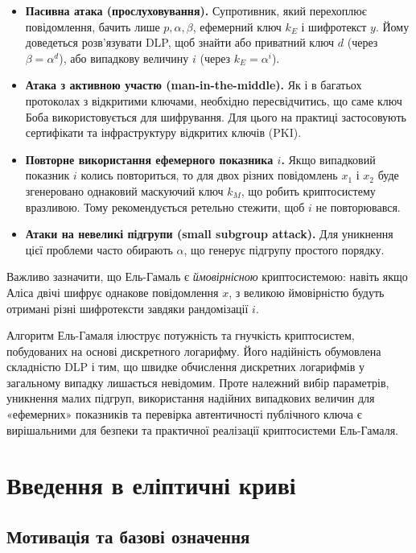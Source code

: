 \documentclass[12pt]{report}
\theoremstyle{definition}
\theoremstyle{plain}
\begin{document}
\begin{itemize}
    \item \textbf{Пасивна атака (прослуховування).} Супротивник, який перехоплює повідомлення, бачить лише \(p, \alpha, \beta\), ефемерний ключ \(k_E\) і шифротекст \(y\). Йому доведеться розв’язувати DLP, щоб знайти або приватний ключ \(d\) (через \(\beta = \alpha^d\)), або випадкову величину \(i\) (через \(k_E = \alpha^i\)).
    \item \textbf{Атака з активною участю (man-in-the-middle).} Як і в багатьох протоколах з відкритими ключами, необхідно пересвідчитись, що саме ключ Боба використовується для шифрування. Для цього на практиці застосовують сертифікати та інфраструктуру відкритих ключів (PKI).
    \item \textbf{Повторне використання ефемерного показника \(i\).} Якщо випадковий показник \(i\) колись повториться, то для двох різних повідомлень \(x_1\) і \(x_2\) буде згенеровано однаковий маскуючий ключ \(k_M\), що робить криптосистему вразливою. Тому рекомендується ретельно стежити, щоб \(i\) не повторювався.
    \item \textbf{Атаки на невеликі підгрупи (small subgroup attack).} Для уникнення цієї проблеми часто обирають \(\alpha\), що генерує підгрупу простого порядку.
\end{itemize}

Важливо зазначити, що Ель-Гамаль є \textit{ймовірнісною} криптосистемою: навіть якщо Аліса двічі шифрує однакове повідомлення \(x\), з великою ймовірністю будуть отримані різні шифротексти завдяки рандомізації \(i\).

Алгоритм Ель-Гамаля ілюструє потужність та гнучкість криптосистем, побудованих на основі дискретного логарифму. Його надійність обумовлена складністю DLP і тим, що швидке обчислення дискретних логарифмів у загальному випадку лишається невідомим. Проте належний вибір параметрів, уникнення малих підгруп, використання надійних випадкових величин для «ефемерних» показників та перевірка автентичності публічного ключа є вирішальними для безпеки та практичної реалізації криптосистеми Ель-Гамаля.

\chapter{Введення в еліптичні криві}
\label{ch:elliptic_curves}

\section{Мотивація та базові означення}
\end{document}
